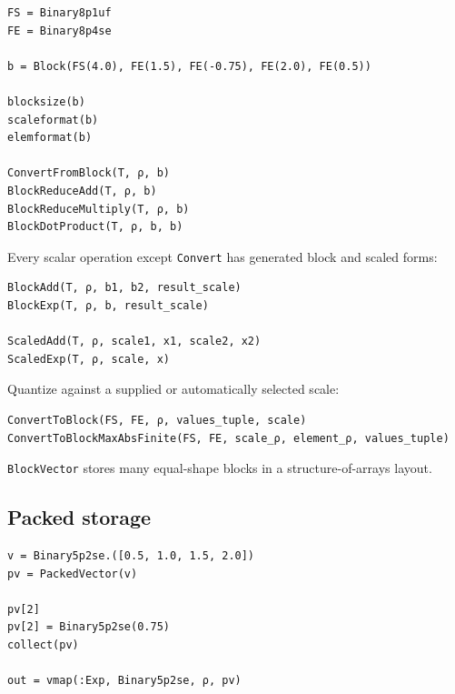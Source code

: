 \label{17754733778172498420-dup1}{}



\begin{verbatim}
FS = Binary8p1uf
FE = Binary8p4se

b = Block(FS(4.0), FE(1.5), FE(-0.75), FE(2.0), FE(0.5))

blocksize(b)
scaleformat(b)
elemformat(b)

ConvertFromBlock(T, ρ, b)
BlockReduceAdd(T, ρ, b)
BlockReduceMultiply(T, ρ, b)
BlockDotProduct(T, ρ, b, b)
\end{verbatim}



Every scalar operation except \texttt{Convert} has generated block and scaled forms:




\nopagebreak[4]
\begin{verbatim}
BlockAdd(T, ρ, b1, b2, result_scale)
BlockExp(T, ρ, b, result_scale)

ScaledAdd(T, ρ, scale1, x1, scale2, x2)
ScaledExp(T, ρ, scale, x)
\end{verbatim}



Quantize against a supplied or automatically selected scale:




\nopagebreak[4]
\begin{verbatim}
ConvertToBlock(FS, FE, ρ, values_tuple, scale)
ConvertToBlockMaxAbsFinite(FS, FE, scale_ρ, element_ρ, values_tuple)
\end{verbatim}



\texttt{BlockVector} stores many equal-shape blocks in a structure-of-arrays layout.



\subsection{Packed storage}



\label{8567984038512272605}{}



\begin{verbatim}
v = Binary5p2se.([0.5, 1.0, 1.5, 2.0])
pv = PackedVector(v)

pv[2]
pv[2] = Binary5p2se(0.75)
collect(pv)

out = vmap(:Exp, Binary5p2se, ρ, pv)
\end{verbatim}



